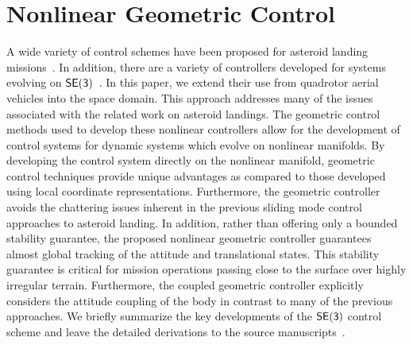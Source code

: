\section{Nonlinear Geometric Control}

A wide variety of control schemes have been proposed for asteroid landing missions~\cite{furfaro2013,li2011a}.
In addition, there are a  variety of controllers developed for systems evolving on \( \mathsf{SE(3)} \)~\cite{lee2010,lee2013}.
In this paper, we extend their use from quadrotor aerial vehicles into the space domain. 
This approach addresses many of the issues associated with the related work on asteroid landings.
The geometric control methods used to develop these nonlinear controllers allow for the development of control systems for dynamic systems which evolve on nonlinear manifolds. 
By developing the control system directly on the nonlinear manifold, geometric control techniques provide unique advantages as compared to those developed using local coordinate representations.
Furthermore, the geometric controller avoids the chattering issues inherent in the previous sliding mode control approaches to asteroid landing.
In addition, rather than offering only a bounded stability guarantee, the proposed nonlinear geometric controller guarantees almost global tracking of the attitude and translational states. 
This stability guarantee is critical for mission operations passing close to the surface over highly irregular terrain.
Furthermore, the coupled geometric controller explicitly considers the attitude coupling of the body in contrast to many of the previous approaches.
We briefly summarize the key developments of the \( \mathsf{SE(3)} \) control scheme and leave the detailed derivations to the source manuscripts~\cite{lee2010,lee2013}.




